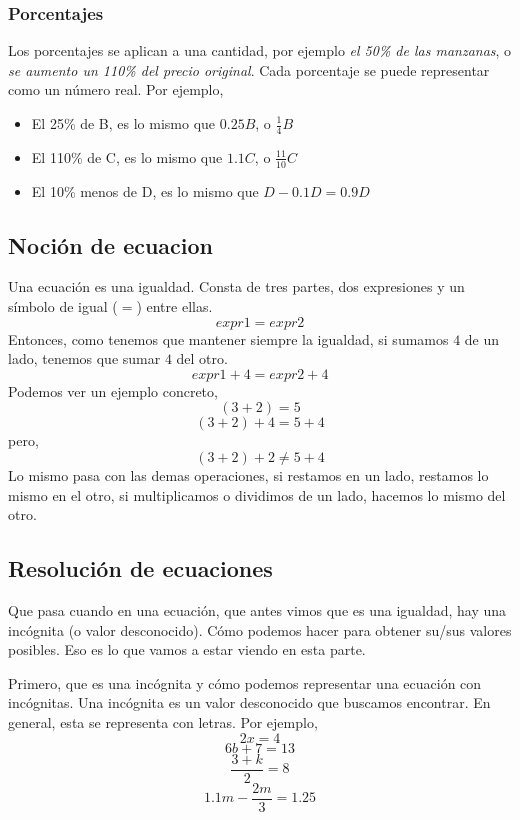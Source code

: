 \documentclass{article}
\begin{document}
\subsubsection*{Porcentajes}
\begin{small}
Los porcentajes se aplican a una cantidad, por ejemplo \textit{el 50\% de las manzanas}, o \textit{se aumento un 110\% del precio original}.
Cada porcentaje se puede representar como un número real.
Por ejemplo,
\begin{itemize}
	\item El 25\% de B, es lo mismo que $0.25B$, o $\frac{1}{4}B$
	\item El 110\% de C, es lo mismo que $1.1C$, o $\frac{11}{10}C$
	\item El 10\% menos de D, es lo mismo que $D-0.1D=0.9D$
\end{itemize}
\end{small}

\subsection{Noción de ecuacion}
\begin{small}
Una ecuación es una igualdad. Consta de tres partes, dos expresiones y un símbolo de igual ($=$) entre ellas.
\[expr1=expr2\]
Entonces, como tenemos que mantener siempre la igualdad, si sumamos $4$ de un lado, tenemos que sumar $4$ del otro.
\[expr1+4=expr2+4\]
Podemos ver un ejemplo concreto,
\[(3+2)=5\]
\[(3+2)+4=5+4\]
pero,
\[(3+2)+2\neq5+4\]
Lo mismo pasa con las demas operaciones, si restamos en un lado, restamos lo mismo en el otro, si multiplicamos o dividimos de un lado, hacemos lo mismo del otro.
\end{small}

\subsection{Resolución de ecuaciones}
\begin{small}
Que pasa cuando en una ecuación, que antes vimos que es una igualdad, hay una incógnita (o valor desconocido). Cómo podemos hacer para obtener su/sus valores posibles. Eso es lo que vamos a estar viendo en esta parte.

Primero, que es una incógnita y cómo podemos representar una ecuación con incógnitas. Una incógnita es un valor desconocido que buscamos encontrar. En general, esta se representa con letras. Por ejemplo, 
\[2x=4\]
\[6b+7=13\]
\[\frac{3+k}{2}=8\]
\[1.1m-\frac{2m}{3}=1.25\]
\end{small}
\end{document}
